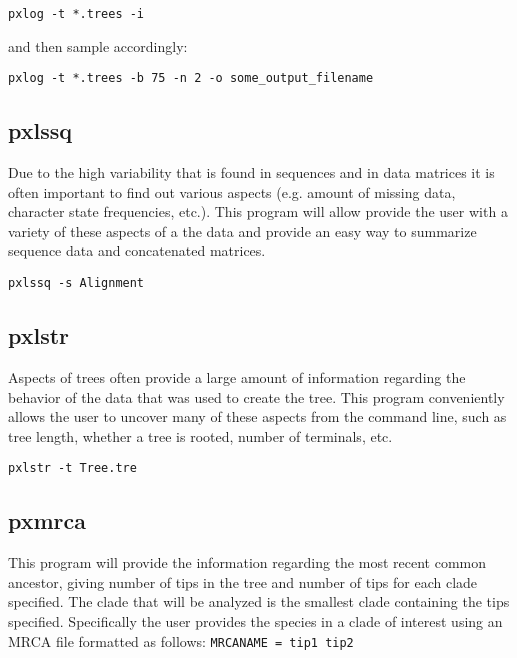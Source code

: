 \documentclass[12pt,letterpaper]{memoir}
\begin{document}
\begin{flushleft}
\begin{verbatim}
pxlog -t *.trees -i
\end{verbatim}
\end{flushleft}
and then sample accordingly:
\begin{flushleft}
\begin{verbatim}
pxlog -t *.trees -b 75 -n 2 -o some_output_filename
\end{verbatim}
\end{flushleft}

\subsection{pxlssq}

Due to the high variability that is found in sequences and in data matrices it is often important to find out various aspects (e.g. amount of missing data, character state frequencies, etc.). This program will allow provide the user with a variety of these aspects of a the data and provide an easy way to summarize sequence data and concatenated matrices.

\begin{flushleft}
\begin{verbatim}
pxlssq -s Alignment
\end{verbatim}
\end{flushleft}

\subsection{pxlstr}

Aspects of trees often provide a large amount of information regarding the behavior of the data that was used to create the tree. This program conveniently allows the user to uncover many of these aspects from the command line, such as tree length, whether a tree is rooted, number of terminals, etc.

\begin{flushleft}
\begin{verbatim}
pxlstr -t Tree.tre
\end{verbatim}
\end{flushleft}

\subsection{pxmrca}

This program will provide the information regarding the most recent common ancestor, giving number of tips in the tree and number of tips for each clade specified. The clade that will be analyzed is the smallest clade containing the tips specified. Specifically the user provides the species in a clade of interest using an MRCA file formatted as follows:
\texttt{MRCANAME = tip1 tip2}
\end{document}
